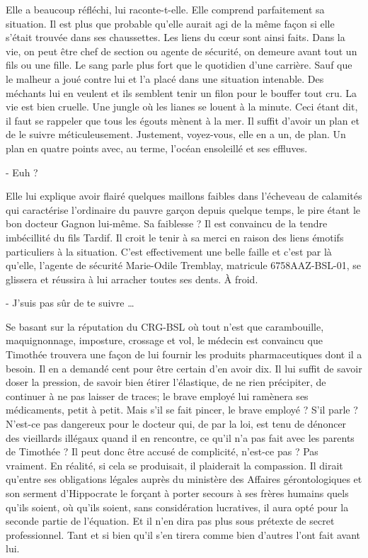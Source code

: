 Elle a beaucoup réfléchi, lui raconte-t-elle. Elle comprend parfaitement sa situation. Il est plus que probable qu’elle aurait agi de la même façon si elle s’était trouvée dans ses chaussettes. Les liens du cœur sont ainsi faits. Dans la vie, on peut être chef de section ou agente de sécurité, on demeure avant tout un fils ou une fille. Le sang parle plus fort que le quotidien d’une carrière. Sauf que le malheur a joué contre lui et l’a placé dans une situation intenable. Des méchants lui en veulent et ils semblent tenir un filon pour le bouffer tout cru. La vie est bien cruelle. Une jungle où les lianes se louent à la minute. Ceci étant dit, il faut se rappeler que tous les égouts mènent à la mer. Il suffit d’avoir un plan et de le suivre méticuleusement. Justement, voyez-vous, elle en a un, de plan. Un plan en quatre points avec, au terme, l’océan ensoleillé et ses effluves.

- Euh ?

Elle lui explique avoir flairé quelques maillons faibles dans l’écheveau de calamités qui caractérise l’ordinaire du pauvre garçon depuis quelque temps, le pire étant le bon docteur Gagnon lui-même. Sa faiblesse ? Il est convaincu de la tendre imbécillité du fils Tardif. Il croit le tenir à sa merci en raison des liens émotifs particuliers à la situation. C’est effectivement une belle faille et c’est par là qu’elle, l’agente de sécurité Marie-Odile Tremblay, matricule 6758AAZ-BSL-01, se glissera et réussira à lui arracher toutes ses dents. À froid.

- J’suis pas sûr de te suivre …

Se basant sur la réputation du CRG-BSL où tout n’est que carambouille, maquignonnage, imposture, crossage et vol, le médecin est convaincu que Timothée trouvera une façon de lui fournir les produits pharmaceutiques dont il a besoin. Il en a demandé cent pour être certain d’en avoir dix. Il lui suffit de savoir doser la pression, de savoir bien étirer l’élastique, de ne rien précipiter, de continuer à ne pas laisser de traces; le brave employé lui ramènera ses médicaments, petit à petit. Mais s’il se fait pincer, le brave employé ? S’il parle ? N’est-ce pas dangereux pour le docteur qui, de par la loi, est tenu de dénoncer des vieillards illégaux quand il en rencontre, ce qu’il n’a pas fait avec les parents de Timothée ? Il peut donc être accusé de complicité, n’est-ce pas ? Pas vraiment. En réalité, si cela se produisait, il plaiderait la compassion. Il dirait qu’entre ses obligations légales auprès du ministère des Affaires gérontologiques et son serment d’Hippocrate le forçant à porter secours à ses frères humains quels qu’ils soient, où qu’ils soient, sans considération lucratives, il aura opté pour la seconde partie de l’équation. Et il n’en dira pas plus sous prétexte de secret professionnel. Tant et si bien qu’il s’en tirera comme bien d’autres l’ont fait avant lui.

